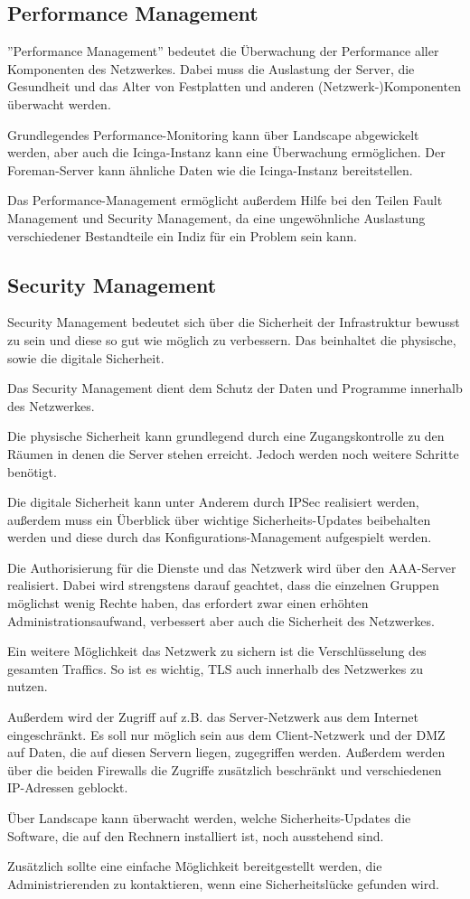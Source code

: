 \subsection{Performance Management}
''Performance Management'' bedeutet die Überwachung der Performance aller Komponenten des Netzwerkes. Dabei muss die Auslastung der Server, die Gesundheit und das Alter von Festplatten und anderen (Netzwerk-)Komponenten überwacht werden.

Grundlegendes Performance-Monitoring kann über Landscape abgewickelt werden, aber auch die Icinga-Instanz kann eine Überwachung ermöglichen. 
Der Foreman-Server kann ähnliche Daten wie die Icinga-Instanz bereitstellen.

Das Performance-Management ermöglicht außerdem Hilfe bei den Teilen Fault Management und Security Management, da eine ungewöhnliche Auslastung verschiedener Bestandteile ein Indiz für ein Problem sein kann.

\newpage
\subsection{Security Management}
Security Management bedeutet sich über die Sicherheit der Infrastruktur bewusst zu sein und diese so gut wie möglich zu verbessern. Das beinhaltet die physische, sowie die digitale Sicherheit.

Das Security Management dient dem Schutz der Daten und Programme innerhalb des Netzwerkes.

Die physische Sicherheit kann grundlegend durch eine Zugangskontrolle zu den Räumen in denen die Server stehen erreicht. Jedoch werden noch weitere Schritte benötigt.

Die digitale Sicherheit kann unter Anderem durch IPSec realisiert werden, außerdem muss ein Überblick über wichtige Sicherheits-Updates beibehalten werden und diese durch das Konfigurations-Management aufgespielt werden.

Die Authorisierung für die Dienste und das Netzwerk wird über den AAA-Server realisiert. Dabei wird strengstens darauf geachtet, dass die einzelnen Gruppen möglichst wenig Rechte haben, das erfordert zwar einen erhöhten Administrationsaufwand, verbessert aber auch die Sicherheit des Netzwerkes.

Ein weitere Möglichkeit das Netzwerk zu sichern ist die Verschlüsselung des gesamten Traffics. So ist es wichtig, TLS auch innerhalb des Netzwerkes zu nutzen.

Außerdem wird der Zugriff auf z.B. das Server-Netzwerk aus dem Internet eingeschränkt. Es soll nur möglich sein aus dem Client-Netzwerk und der DMZ auf Daten, die auf diesen Servern liegen, zugegriffen werden. Außerdem werden über die beiden Firewalls die Zugriffe zusätzlich beschränkt und verschiedenen IP-Adressen geblockt.

Über Landscape kann überwacht werden, welche Sicherheits-Updates die Software, die auf den Rechnern installiert ist, noch ausstehend sind.

Zusätzlich sollte eine einfache Möglichkeit bereitgestellt werden, die Administrierenden zu kontaktieren, wenn eine Sicherheitslücke gefunden wird.